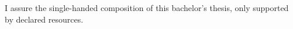 
\clearemptydoublepage

\thispagestyle{empty}

\vspace*{0.8\textheight}
\noindent
I assure the single-handed composition of this bachelor's thesis, only supported by declared resources.

\vspace{15mm}
\noindent
\theplace \quad \thedate \hspace{6cm} \theauthor

\newpage
